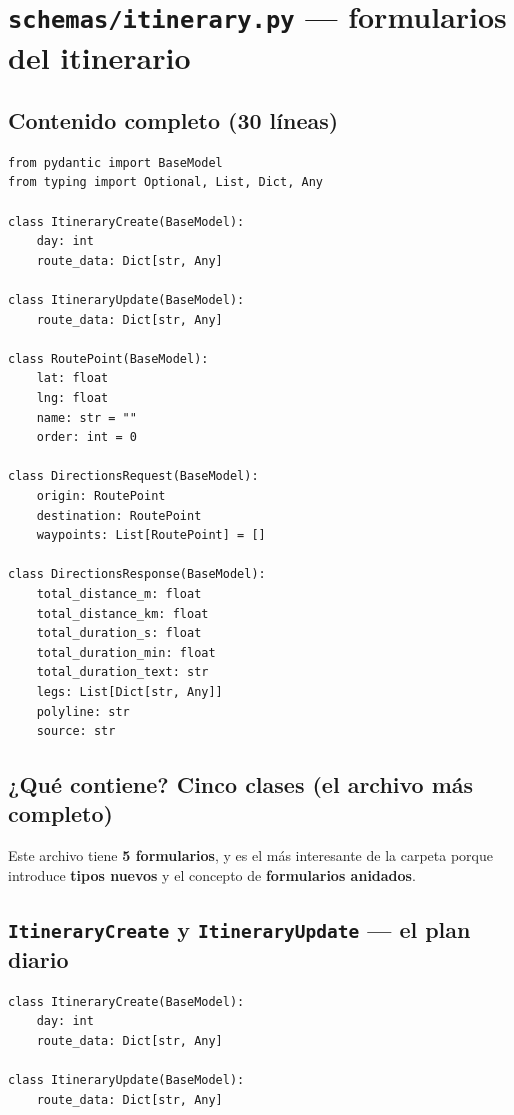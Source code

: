 \documentclass[11pt,a4paper]{article}
\begin{document}
\section{\texttt{schemas/itinerary.py} --- formularios del itinerario}

\subsection{Contenido completo (30 líneas)}

\begin{lstlisting}
from pydantic import BaseModel
from typing import Optional, List, Dict, Any

class ItineraryCreate(BaseModel):
    day: int
    route_data: Dict[str, Any]

class ItineraryUpdate(BaseModel):
    route_data: Dict[str, Any]

class RoutePoint(BaseModel):
    lat: float
    lng: float
    name: str = ""
    order: int = 0

class DirectionsRequest(BaseModel):
    origin: RoutePoint
    destination: RoutePoint
    waypoints: List[RoutePoint] = []

class DirectionsResponse(BaseModel):
    total_distance_m: float
    total_distance_km: float
    total_duration_s: float
    total_duration_min: float
    total_duration_text: str
    legs: List[Dict[str, Any]]
    polyline: str
    source: str
\end{lstlisting}

\subsection{¿Qué contiene? \textbf{Cinco} clases (el archivo más completo)}

Este archivo tiene \textbf{5 formularios}, y es el más interesante de la carpeta porque
introduce \textbf{tipos nuevos} y el concepto de \textbf{formularios anidados}.

\subsection{\texttt{ItineraryCreate} y \texttt{ItineraryUpdate} --- el plan diario}

\begin{lstlisting}
class ItineraryCreate(BaseModel):
    day: int
    route_data: Dict[str, Any]

class ItineraryUpdate(BaseModel):
    route_data: Dict[str, Any]
\end{lstlisting}
\end{document}
